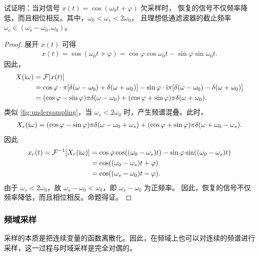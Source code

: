 \begin{exercise}
    试证明：当对信号 $x(t) = \cos(\omega_0 t + \varphi)$ 欠采样时，
    恢复的信号不仅频率降低，而且相位相反。其中，$\omega_0 < \omega_s < 2\omega_0$，
    且理想低通滤波器的截止频率 $\omega_c \in (\omega_s - \omega_0, \omega_0)$。
\end{exercise}

\begin{proof}
    展开 $x(t)$ 可得
    \begin{align*}
        x(t) = \cos(\omega_0 t + \varphi) = \cos\varphi\cos\omega_0 t- \sin\varphi \sin\omega_0 t.
    \end{align*}
    因此，
    \begin{align*}
        X(\mathrm{i}\omega) & = \mathcal{F}[x(t)] \\
        & = \cos\varphi\cdot \pi[\delta(\omega - \omega_0) + \delta(\omega + \omega_0)]
            - \sin\varphi\cdot \mathrm{i}\pi[\delta(\omega - \omega_0) - \delta(\omega + \omega_0)] \\
        & = (\cos\varphi - \sin\varphi)\pi\delta(\omega - \omega_0)
            + (\cos\varphi+ \sin\varphi)\pi\delta(\omega + \omega_0).
    \end{align*}
    类似 \ref{fig:undersampling}，当 $\omega_s < 2\omega_0$ 时，产生频谱混叠。此时，
    \begin{align*}
        X_r(\mathrm{i}\omega) = (\cos\varphi - \sin\varphi)\pi\delta(\omega - \omega_0 + \omega_s)
            + (\cos\varphi + \sin\varphi)\pi\delta(\omega + \omega_0 - \omega_s).
    \end{align*}
    因此
    \begin{align*}
        x_r(t) = \mathcal{F}^{-1}[X_r(\mathrm{i}\omega)] & = \cos\varphi\cos((\omega_0 - \omega_s)t)
            - \sin\varphi\sin((\omega_0 - \omega_s)t) \\
        & = \cos((\omega_0 - \omega_s)t + \varphi) \\
        & = \cos((\omega_s - \omega_0)t - \varphi).
    \end{align*}
    由于 $\omega_s < 2\omega_0$，故 $\omega_s - \omega_0 < \omega_0$，即 $\omega_s - \omega_0$ 为正频率。
    因此，恢复的信号不仅频率降低，而且相位相反。命题得证。
\end{proof}

\subsubsection{频域采样}

采样的本质是把连续变量的函数离散化。因此，在频域上也可以对连续的频谱进行采样，这一过程与时域采样是完全对偶的。

